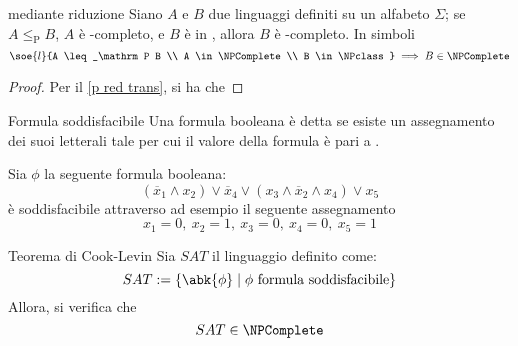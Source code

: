 \documentclass[a4paper, 12pt]{report}
\begin{document}
    \begin{framedthm}[label={np-complete w red}]{\NPComplete mediante riduzione}
        Siano $A$ e $B$ due linguaggi definiti su un alfabeto $\Sigma$; se $A \leq_\mathrm P B$, $A$ è \NPclass-completo, e $B$ è in \NPclass, allora $B$ è \NPclass-completo. In simboli $$\soe{l}{A \leq_\mathrm P B \\ A \in \NPComplete \\ B \in \NPclass} \implies B \in \NPComplete$$
    \end{framedthm}

    \begin{proof}
        Per il \cref{p red trans}, si ha che 
    \end{proof}

    \begin{frameddefn}{Formula soddisfacibile}
        Una formula booleana è detta  se esiste un assegnamento dei suoi letterali tale per cui il valore della formula è pari a .
    \end{frameddefn}

    \begin{example}
        Sia $\phi$ la seguente formula booleana: $$(\overline x_1 \land x_2) \lor \overline x_4 \lor (x_3 \land \overline x_2 \land x_4) \lor x_5$$ è soddisfacibile attraverso ad esempio il seguente assegnamento $$x_1 = 0, \ x_2 = 1, \ x_3 = 0, \ x_4 = 0, \ x_5 = 1$$
    \end{example}

    \begin{framedthm}[label={cook-levin}]{Teorema di Cook-Levin}
        Sia $SAT$ il linguaggio definito come: $$SAT := \{\abk{\phi} \mid \phi \ \textrm{formula soddisfacibile}\}$$ Allora, si verifica che $$SAT \in \NPComplete$$
    \end{framedthm}
\end{document}
